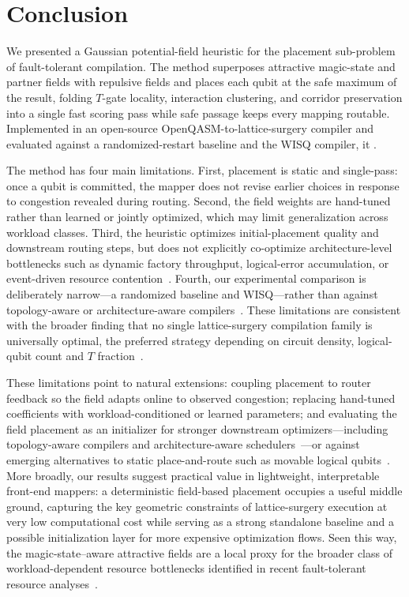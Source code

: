 \section{Conclusion}
\label{sec:conclusion}

We presented a Gaussian potential-field heuristic for the placement sub-problem of
fault-tolerant compilation. The method superposes attractive magic-state and
partner fields with repulsive fields and places each qubit at the safe maximum of
the result, folding $T$-gate locality, interaction clustering, and corridor
preservation into a single fast scoring pass while safe passage keeps every
mapping routable. Implemented in an open-source OpenQASM-to-lattice-surgery
compiler and evaluated against a randomized-restart baseline and the WISQ
compiler, it .

The method has four main limitations. First, placement is static and single-pass:
once a qubit is committed, the mapper does not revise earlier choices in response
to congestion revealed during routing. Second, the field weights are hand-tuned
rather than learned or jointly optimized, which may limit generalization across
workload classes. Third, the heuristic optimizes initial-placement quality and
downstream routing steps, but does not explicitly co-optimize architecture-level
bottlenecks such as dynamic factory throughput, logical-error accumulation, or
event-driven resource contention~\cite{kan2025sparo,bharadwaj2026qomet}. Fourth,
our experimental comparison is deliberately narrow---a randomized baseline and
WISQ---rather than against topology-aware or architecture-aware
compilers~\cite{zhou2026topols,kan2025sparo}. These limitations are consistent
with the broader finding that no single lattice-surgery compilation family is
universally optimal, the preferred strategy depending on circuit density,
logical-qubit count and $T$ fraction~\cite{leblond2025comparison}.

These limitations point to natural extensions: coupling placement to router
feedback so the field adapts online to observed congestion; replacing hand-tuned
coefficients with workload-conditioned or learned parameters; and evaluating the
field placement as an initializer for stronger downstream optimizers---including
topology-aware compilers and architecture-aware
schedulers~\cite{zhou2026topols,bharadwaj2026qomet}---or against emerging
alternatives to static place-and-route such as movable logical
qubits~\cite{herzog2025movable}. More broadly, our results suggest practical value
in lightweight, interpretable front-end mappers: a deterministic field-based
placement occupies a useful middle ground, capturing the key geometric constraints
of lattice-surgery execution at very low computational cost while serving as a
strong standalone baseline and a possible initialization layer for more expensive
optimization flows. Seen this way, the magic-state--aware attractive fields are a
local proxy for the broader class of workload-dependent resource bottlenecks
identified in recent fault-tolerant resource
analyses~\cite{ogorman2017factories,leblond2025comparison}.
